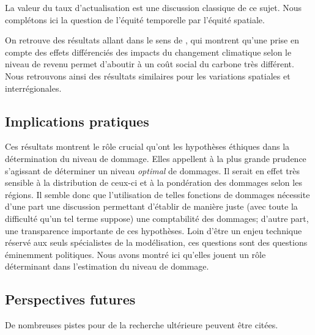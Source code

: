 La valeur du taux d'actualisation est une discussion classique de ce sujet. Nous complétons ici la question de l'équité temporelle par l'équité spatiale. 

On retrouve des résultats allant dans le sens de \textcite{dennig_inequality_2015}, qui montrent qu'une prise en compte des effets différenciés des impacts du changement climatique selon le niveau de revenu permet d'aboutir à un coût social du carbone très différent. Nous retrouvons ainsi des résultats similaires pour les variations spatiales et interrégionales. 


\subsection{Implications pratiques}

Ces résultats montrent le rôle crucial qu'ont les hypothèses éthiques dans la détermination du niveau de dommage. Elles appellent à la plus grande prudence s'agissant de déterminer un niveau \emph{optimal} de dommages. Il serait en effet très sensible à la distribution de ceux-ci et à la pondération des dommages selon les régions. Il semble donc que l'utilisation de telles fonctions de dommages nécessite d'une part une discussion permettant d'établir de manière juste (avec toute la difficulté qu'un tel terme suppose) une comptabilité des dommages; d'autre part, une transparence importante de ces hypothèses. Loin d'être un enjeu technique réservé aux seuls spécialistes de la modélisation, ces questions sont des questions éminemment politiques. Nous avons montré ici qu'elles jouent un rôle déterminant dans l'estimation du niveau de dommage. 


\subsection{Perspectives futures}

De nombreuses pistes pour de la recherche ultérieure peuvent être citées. \\

